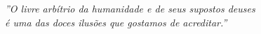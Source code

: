 \begin{epigrafe}
	\vspace*{\fill}
	\begin{flushright}
		\textit{”O livre arbítrio da humanidade e de seus supostos deuses \\é uma das doces ilusões que gostamos de acreditar.”}
	\end{flushright}
\end{epigrafe}